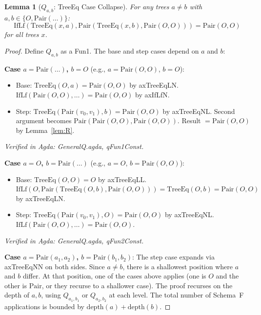 \documentclass[11pt]{article}
\newtheorem{lemma}[theorem]{Lemma}
\begin{document}
\begin{lemma}[$Q_{a,b}$: TreeEq Case Collapse]\label{lem:Q}
For any trees $a \neq b$ with $a, b \in \{O, \mathrm{Pair}(\ldots)\}$:
\[
  \mathrm{IfLf}(\mathrm{TreeEq}(x, a), \mathrm{Pair}(\mathrm{TreeEq}(x, b), \mathrm{Pair}(O,O))) = \mathrm{Pair}(O,O)
\]
for all trees $x$.
\end{lemma}
\begin{proof}
Define $Q_{a,b}$ as a Fun1. The base and step cases depend on $a$ and $b$:

\medskip\noindent
\textbf{Case $a = \mathrm{Pair}(\ldots)$, $b = O$} (e.g., $a = \mathrm{Pair}(O,O)$, $b = O$):
\begin{itemize}
\item Base: $\mathrm{TreeEq}(O, a) = \mathrm{Pair}(O,O)$ by axTreeEqLN.
  $\mathrm{IfLf}(\mathrm{Pair}(O,O), \ldots) = \mathrm{Pair}(O,O)$ by axIfLfN.
\item Step: $\mathrm{TreeEq}(\mathrm{Pair}(v_0,v_1), b) = \mathrm{Pair}(O,O)$ by axTreeEqNL.
  Second argument becomes $\mathrm{Pair}(\mathrm{Pair}(O,O), \mathrm{Pair}(O,O))$.
  Result $= \mathrm{Pair}(O,O)$ by Lemma~\ref{lem:R}.
\end{itemize}
\emph{Verified in Agda: GeneralQ.agda, qFun1Const.}

\medskip\noindent
\textbf{Case $a = O$, $b = \mathrm{Pair}(\ldots)$} (e.g., $a = O$, $b = \mathrm{Pair}(O,O)$):
\begin{itemize}
\item Base: $\mathrm{TreeEq}(O, O) = O$ by axTreeEqLL.
  $\mathrm{IfLf}(O, \mathrm{Pair}(\mathrm{TreeEq}(O, b), \mathrm{Pair}(O,O))) = \mathrm{TreeEq}(O, b) = \mathrm{Pair}(O,O)$ by axTreeEqLN.
\item Step: $\mathrm{TreeEq}(\mathrm{Pair}(v_0,v_1), O) = \mathrm{Pair}(O,O)$ by axTreeEqNL.
  $\mathrm{IfLf}(\mathrm{Pair}(O,O), \ldots) = \mathrm{Pair}(O,O)$.
\end{itemize}
\emph{Verified in Agda: GeneralQ.agda, qFun2Const.}

\medskip\noindent
\textbf{Case $a = \mathrm{Pair}(a_1, a_2)$, $b = \mathrm{Pair}(b_1, b_2)$}:
The step case expands via axTreeEqNN on both sides. Since $a \neq b$, there is a shallowest
position where $a$ and $b$ differ. At that position, one of the cases above applies (one is $O$
and the other is $\mathrm{Pair}$, or they recurse to a shallower case). The proof recurses on the
depth of $a, b$, using $Q_{a_1, b_1}$ or $Q_{a_2, b_2}$ at each level.
The total number of Schema~F applications is bounded by $\mathrm{depth}(a) + \mathrm{depth}(b)$.
\end{proof}
\end{document}
